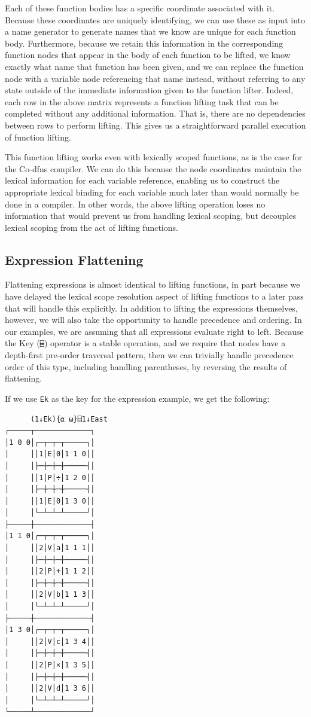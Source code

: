 ﻿\documentclass[numbers,10pt,preprint]{sigplanconf}
\begin{document}
Each of these function bodies has a specific coordinate associated with it. Because these coordinates are uniquely identifying, we can use these as input into a name generator to generate names that we know are unique for each function body. Furthermore, because we retain this information in the corresponding function nodes that appear in the body of each function to be lifted, we know exactly what name that function has been given, and we can replace the function node with a variable node referencing that name instead, without referring to any state outside of the immediate information given to the function lifter. Indeed, each row in the above matrix represents a function lifting task that can be completed without any additional information. That is, there are no dependencies between rows to perform lifting. This gives us a straightforward parallel execution of function lifting.

This function lifting works even with lexically scoped functions, as is the case for the Co-dfns compiler. We can do this because the node coordinates maintain the lexical information for each variable reference, enabling us to construct the appropriate lexical binding for each variable much later than would normally be done in a compiler. In other words, the above lifting operation loses no information that would prevent us from handling lexical scoping, but decouples lexical scoping from the act of lifting functions.

\subsection{Expression Flattening}

Flattening expressions is almost identical to lifting functions, in part because we have delayed the lexical scope resolution aspect of lifting functions to a later pass that will handle this explicitly. In addition to lifting the expressions themselves, however, we will also take the opportunity to handle precedence and ordering. In our examples, we are assuming that all expressions evaluate right to left. Because the Key (\verb;⌸;) operator is a stable operation, and we require that nodes have a depth-first pre-order traversal pattern, then we can trivially handle precedence order of this type, including handling parentheses, by reversing the results of flattening.

If we use \verb;Ek; as the key for the expression example, we get the following:

\begin{verbatim}
      (1↓Ek){⍺ ⍵}⌸1↓East
┌─────┬─────────────┐
│1 0 0│┌─┬─┬─┬─────┐│
│     ││1│E│0│1 1 0││
│     │├─┼─┼─┼─────┤│
│     ││1│P│÷│1 2 0││
│     │├─┼─┼─┼─────┤│
│     ││1│E│0│1 3 0││
│     │└─┴─┴─┴─────┘│
├─────┼─────────────┤
│1 1 0│┌─┬─┬─┬─────┐│
│     ││2│V│a│1 1 1││
│     │├─┼─┼─┼─────┤│
│     ││2│P│+│1 1 2││
│     │├─┼─┼─┼─────┤│
│     ││2│V│b│1 1 3││
│     │└─┴─┴─┴─────┘│
├─────┼─────────────┤
│1 3 0│┌─┬─┬─┬─────┐│
│     ││2│V│c│1 3 4││
│     │├─┼─┼─┼─────┤│
│     ││2│P│×│1 3 5││
│     │├─┼─┼─┼─────┤│
│     ││2│V│d│1 3 6││
│     │└─┴─┴─┴─────┘│
└─────┴─────────────┘
\end{verbatim}
\end{document}
